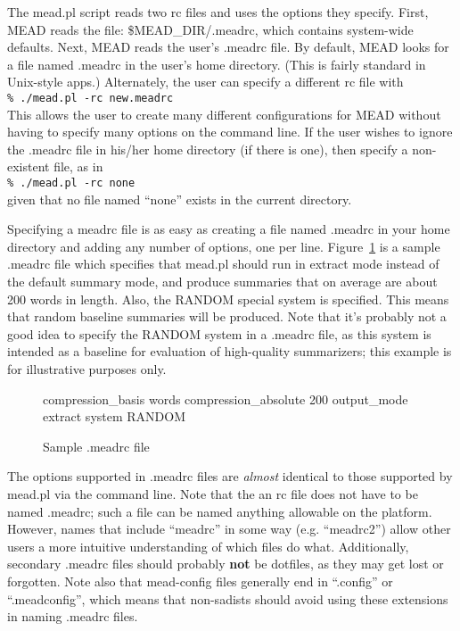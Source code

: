 \documentclass[10pt]{article}
\begin{document}
The mead.pl script reads two rc files and uses the options they
specify.  First, MEAD reads the file: \$MEAD\_DIR/\-.meadrc, which
contains system-wide defaults.  Next, MEAD reads the user's .meadrc
file.  By default, MEAD looks for a file named .meadrc in the user's
home directory.  (This is fairly standard in Unix-style apps.)
Alternately, the user can specify a different rc file with\\

    \verb|% ./mead.pl -rc new.meadrc|\\

This allows the user to create many different configurations for MEAD
without having to specify many options on the command line.  If the 
user wishes to ignore the .meadrc file in his/her home directory (if
there is one), then specify a non-existent file, as in\\

    \verb|% ./mead.pl -rc none|\\

\noindent
given that no file named ``none'' exists in the current directory.

Specifying a meadrc file is as easy as creating a file named
.meadrc in your home directory and adding any number of options,
one per line.  Figure~\ref{figure:meadrc} is a sample .meadrc
file which specifies that mead.pl should run in extract mode 
instead of the default summary mode, and produce summaries that
on average are about 200 words in length.
Also, the RANDOM special system is
specified.  This means that random baseline summaries will be
produced.  Note that it's probably not a good idea to specify the
RANDOM system in a .meadrc file, as this system is intended as
a baseline for evaluation of high-quality summarizers;
this example is for illustrative purposes only.

\begin{figure}[htp!]
\centering
\begin{boxedverbatim}
compression_basis       words
compression_absolute    200
output_mode             extract
system                  RANDOM
\end{boxedverbatim}
\caption{Sample .meadrc file}
\label{figure:meadrc}
\end{figure}

The options
supported in .meadrc files are {\it almost} identical to those supported by 
mead.pl via the command line.  Note that the an rc file does not have
to be named .meadrc; such a file can be named anything allowable on 
the platform.  However, names that include ``meadrc'' 
in some way (e.g. ``meadrc2'') allow
other users a more intuitive understanding of which files do
what.  Additionally, secondary .meadrc files should probably 
{\bf not} be dotfiles, as they may get lost or forgotten.
Note also that mead-config files generally end in ``.config'' or
``.meadconfig'', which means that non-sadists should avoid using
these extensions in naming .meadrc files.
\end{document}
